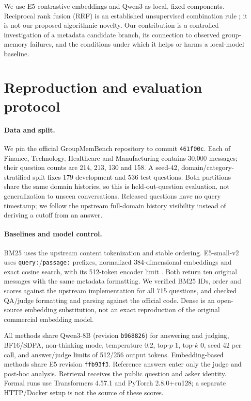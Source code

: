 \documentclass[10pt,a4paper]{article}
\begin{document}
We use E5 contrastive embeddings \cite{e5} and Qwen3 \cite{qwen3} as local, fixed components. Reciprocal rank fusion (RRF) is an established unsupervised combination rule \cite{rrf}; it is not our proposed algorithmic novelty. Our contribution is a controlled investigation of a metadata candidate branch, its connection to observed group-memory failures, and the conditions under which it helps or harms a local-model baseline.

\section{Reproduction and evaluation protocol}
\paragraph{Data and split.}
We pin the official GroupMemBench repository to commit \texttt{461f00c}. Each of Finance, Technology, Healthcare and Manufacturing contains 30,000 messages; their question counts are 214, 213, 130 and 158. A seed-42, domain/category-stratified split fixes 179 development and 536 test questions. Both partitions share the same domain histories, so this is held-out-question evaluation, not generalization to unseen conversations. Released questions have no query timestamp; we follow the upstream full-domain history visibility instead of deriving a cutoff from an answer.

\paragraph{Baselines and model control.}
BM25 uses the upstream content tokenization and stable ordering. E5-small-v2 uses \texttt{query:}/\texttt{passage:} prefixes, normalized 384-dimensional embeddings and exact cosine search, with its 512-token encoder limit \cite{e5card}. Both return ten original messages with the same metadata formatting. We verified BM25 IDs, order and scores against the upstream implementation for all 715 questions, and checked QA/judge formatting and parsing against the official code. Dense is an open-source embedding substitution, not an exact reproduction of the original commercial embedding model.

All methods share Qwen3-8B (revision \texttt{b968826}) for answering and judging, BF16/SDPA, non-thinking mode, temperature 0.2, top-$p$ 1, top-$k$ 0, seed 42 per call, and answer/judge limits of 512/256 output tokens. Embedding-based methods share E5 revision \texttt{ffb93f3}. Reference answers enter only the judge and post-hoc analysis. Retrieval receives the public question and asker identity. Formal runs use Transformers 4.57.1 and PyTorch 2.8.0+cu128; a separate HTTP/Docker setup is not the source of these scores.
\end{document}
